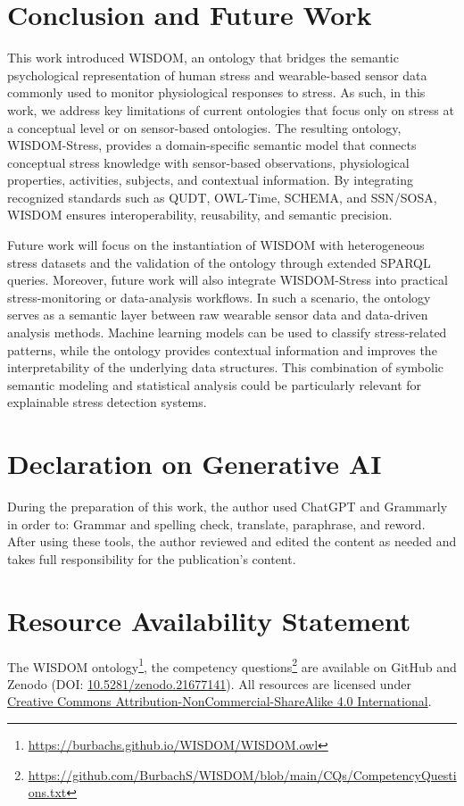 \documentclass[
]{ceurart}
\begin{document}
\section{Conclusion and Future Work} \label{sec:conclusion}
This work introduced WISDOM, an ontology that bridges the semantic psychological representation of human stress and wearable-based sensor data commonly used to monitor physiological responses to stress. As such, in this work, we address key limitations of current ontologies that focus only on stress at a conceptual level or on sensor-based ontologies. The resulting ontology, WISDOM-Stress, provides a domain-specific semantic model that connects conceptual stress knowledge with sensor-based observations, physiological properties, activities, subjects, and contextual information. By integrating recognized standards such as QUDT, OWL-Time, SCHEMA, and SSN/SOSA, WISDOM ensures interoperability, reusability, and semantic precision.

Future work will focus on the instantiation of WISDOM with heterogeneous stress datasets and the validation of the ontology through extended SPARQL queries. Moreover, future work will also integrate WISDOM-Stress into practical stress-monitoring or data-analysis workflows. In such a scenario, the ontology serves as a semantic layer between raw wearable sensor data and data-driven analysis methods. Machine learning models can be used to classify stress-related patterns, while the ontology provides contextual information and improves the interpretability of the underlying data structures. This combination of symbolic semantic modeling and statistical analysis could be particularly relevant for explainable stress detection systems.


\section*{Declaration on Generative AI}
During the preparation of this work, the author used ChatGPT and Grammarly in order to: Grammar and spelling check, translate, paraphrase, and reword. After using these tools, the author reviewed and edited the content as needed and takes full responsibility for the publication’s content.

\section*{Resource Availability Statement} \label{sec:resources}
The WISDOM ontology\footnote{\url{https://burbachs.github.io/WISDOM/WISDOM.owl}}, the competency questions\footnote{\url{https://github.com/BurbachS/WISDOM/blob/main/CQs/CompetencyQuestions.txt}} are available on GitHub \cite{BurbachSGitHub2026} and Zenodo (DOI: \href{https://doi.org/10.5281/zenodo.21677141}{10.5281/zenodo.21677141}). All resources are licensed under \href{https://creativecommons.org/licenses/by-nc-sa/4.0/}{Creative Commons Attribution-NonCommercial-ShareAlike 4.0 International}.


\end{document}

